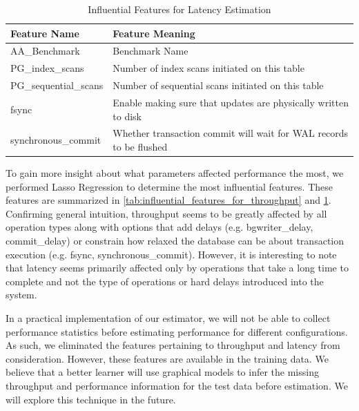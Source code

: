 \begin{table}[t]
  \centering
  \begin{adjustbox}{max width=\textwidth}
    \begin{tabular}{ll}
      \toprule
      Feature Name          & Feature Meaning                                                    \\
      \midrule
      AA\_Benchmark         & Benchmark Name                                                     \\
      PG\_index\_scans      & Number of index scans initiated on this table                      \\
      PG\_sequential\_scans & Number of sequential scans initiated on this table                 \\
      fsync                 & Enable making sure that updates are physically written to disk     \\
      synchronous\_commit   & Whether transaction commit will wait for WAL records to be flushed \\
      \bottomrule
    \end{tabular}
  \end{adjustbox}

  \caption{Influential Features for Latency Estimation}
  \label{tab:influential_features_for_latency}
\end{table}

To gain more insight about what parameters affected performance the
most, we performed Lasso Regression to determine the most influential
features. These features are summarized in
\cref{tab:influential_features_for_throughput} and
\cref{tab:influential_features_for_latency}. Confirming general
intuition, throughput seems to be greatly affected by all operation
types along with options that add delays (e.g. bgwriter\_delay,
commit\_delay) or constrain how relaxed the database can be about
transaction execution (e.g. fsync, synchronous\_commit). However, it
is interesting to note that latency seems primarily affected only by
operations that take a long time to complete and not the type of
operations or hard delays introduced into the system.

In a practical implementation of our estimator, we will not be able
to collect performance statistics before estimating performance for
different configurations. As such, we eliminated the features
pertaining to throughput and latency from consideration. However,
these features are available in the training data. We believe that a
better learner will use graphical models to infer the missing
throughput and performance information for the test data before
estimation. We will explore this technique in the future.